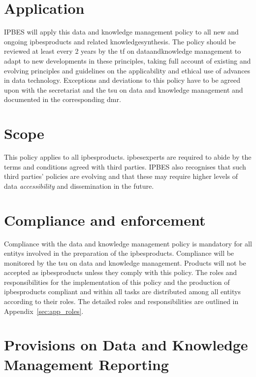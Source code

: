 \documentclass{article}
\begin{document}
\section{Application}

IPBES will apply this \gls{data} and \gls{knowledge} management policy to all new and ongoing \glspl{ipbesproduct} and related \gls{knowledgesynthesis}. The policy should be reviewed at least every 2 years by the \gls{tf} on \gls{dataandknowledge} management to adapt to new developments in these principles, taking full account of existing and evolving principles and guidelines on the applicability and ethical use of advances in \gls{data} technology. Exceptions and deviations to this policy have to be agreed upon with the \gls{secretariat} and the  \gls{tsu} on \gls{data} and \gls{knowledge} management and documented in the corresponding \gls{dmr}.

\section{Scope}

This policy applies to all \glspl{ipbesproduct}. \glspl{ipbesexpert} are required to abide by the terms and conditions agreed with third parties. IPBES also recognises that such third parties’ policies are evolving and that these may require higher levels of \gls{data} \textit{accessibility} and dissemination in the future.

\section{Compliance and enforcement}

Compliance with the data and knowledge management policy is mandatory for all \glspl{entity} involved in the preparation of the \glspl{ipbesproduct}. Compliance will be monitored by the \gls{tsu} on data and knowledge management. Products will not be accepted as \glspl{ipbesproduct} unless they comply with this policy. 
The roles and responsibilities for the implementation of this policy and the production of \glspl{ipbesproduct} compliant and within all \glspl{task} are distributed among all \glspl{entity} according to their roles. The detailed roles and responsibilities are outlined in Appendix~\ref{sec:app_roles}.

\section{Provisions on Data and Knowledge Management Reporting}
\end{document}

